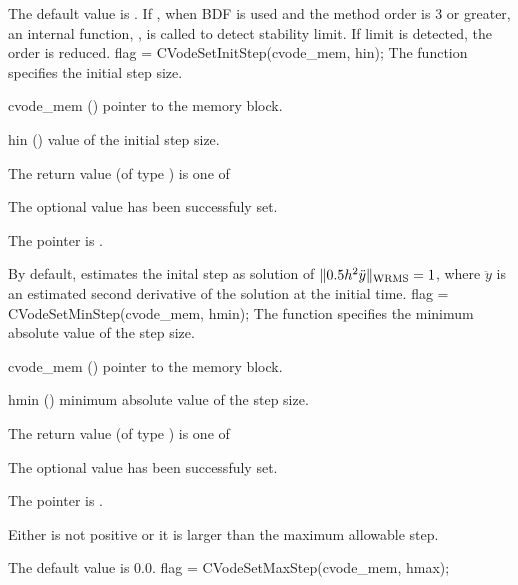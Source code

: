 {
  The default value is . If , when BDF is used
  and the method order is 3 or greater, an internal function, ,
  is called to detect stability limit. If limit is detected, the order is reduced.
}
{
flag = CVodeSetInitStep(cvode\_mem, hin);
}
{
  The function  specifies the initial step size.
}
{
  \begin{args}
  \item[cvode\_mem] ()
    pointer to the {\cvode} memory block.
  \item[hin] ()
    value of the initial step size.
  \end{args}
}
{
  The return value  (of type ) is one of
  \begin{args}
  \item[\Id{SUCCESS}] 
    The optional value has been successfuly set.
  \item[\Id{CVS\_NO\_MEM}]
    The  pointer is .
  \end{args}
}
{
  By default, {\cvode} estimates the inital step as solution of 
  $\| 0.5 h^2 \ddot y \|_{\mbox{\scriptsize WRMS}} = 1$,
  where $\ddot y$ is an estimated second derivative of the solution at the
  initial time.
}
{
flag = CVodeSetMinStep(cvode\_mem, hmin);
}
{
  The function  specifies the minimum absolute
  value of the step size.
}
{
  \begin{args}
  \item[cvode\_mem] ()
    pointer to the {\cvode} memory block.
  \item[hmin] ()
    minimum absolute value of the step size.
  \end{args}
}
{
  The return value  (of type ) is one of
  \begin{args}
  \item[\Id{SUCCESS}] 
    The optional value has been successfuly set.
  \item[\Id{CVS\_NO\_MEM}]
    The  pointer is .
  \item[\Id{CVS\_ILL\_INPUT}]
    Either  is not positive or it is larger than the maximum allowable step.
  \end{args}
}
{
  The default value is $0.0$.
}
{
flag = CVodeSetMaxStep(cvode\_mem, hmax);
}

